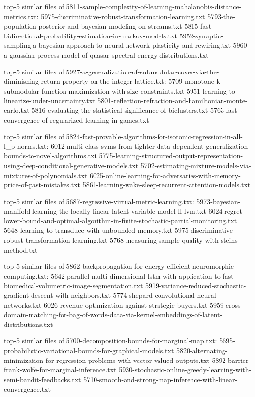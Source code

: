 \documentclass[11pt]{article}
\begin{document}
top-5 similar files of
5811-sample-complexity-of-learning-mahalanobis-distance-metrics.txt:
5975-discriminative-robust-transformation-learning.txt
5793-the-population-posterior-and-bayesian-modeling-on-streams.txt
5815-fast-bidirectional-probability-estimation-in-markov-models.txt
5952-synaptic-sampling-a-bayesian-approach-to-neural-network-plasticity-and-rewiring.txt
5960-a-gaussian-process-model-of-quasar-spectral-energy-distributions.txt

top-5 similar files of
5927-a-generalization-of-submodular-cover-via-the-diminishing-return-property-on-the-integer-lattice.txt:
5709-monotone-k-submodular-function-maximization-with-size-constraints.txt
5951-learning-to-linearize-under-uncertainty.txt
5801-reflection-refraction-and-hamiltonian-monte-carlo.txt
5816-evaluating-the-statistical-significance-of-biclusters.txt
5763-fast-convergence-of-regularized-learning-in-games.txt

top-5 similar files of
5824-fast-provable-algorithms-for-isotonic-regression-in-all-l\_p-norms.txt:
6012-multi-class-svms-from-tighter-data-dependent-generalization-bounds-to-novel-algorithms.txt
5775-learning-structured-output-representation-using-deep-conditional-generative-models.txt
5702-estimating-mixture-models-via-mixtures-of-polynomials.txt
6025-online-learning-for-adversaries-with-memory-price-of-past-mistakes.txt
5861-learning-wake-sleep-recurrent-attention-models.txt

top-5 similar files of 5687-regressive-virtual-metric-learning.txt:
5973-bayesian-manifold-learning-the-locally-linear-latent-variable-model-ll-lvm.txt
6024-regret-lower-bound-and-optimal-algorithm-in-finite-stochastic-partial-monitoring.txt
5648-learning-to-transduce-with-unbounded-memory.txt
5975-discriminative-robust-transformation-learning.txt
5768-measuring-sample-quality-with-steins-method.txt

top-5 similar files of
5862-backpropagation-for-energy-efficient-neuromorphic-computing.txt:
5642-parallel-multi-dimensional-lstm-with-application-to-fast-biomedical-volumetric-image-segmentation.txt
5919-variance-reduced-stochastic-gradient-descent-with-neighbors.txt
5774-shepard-convolutional-neural-networks.txt
6026-revenue-optimization-against-strategic-buyers.txt
5959-cross-domain-matching-for-bag-of-words-data-via-kernel-embeddings-of-latent-distributions.txt

top-5 similar files of 5700-decomposition-bounds-for-marginal-map.txt:
5695-probabilistic-variational-bounds-for-graphical-models.txt
5820-alternating-minimization-for-regression-problems-with-vector-valued-outputs.txt
5892-barrier-frank-wolfe-for-marginal-inference.txt
5930-stochastic-online-greedy-learning-with-semi-bandit-feedbacks.txt
5710-smooth-and-strong-map-inference-with-linear-convergence.txt
\end{document}

